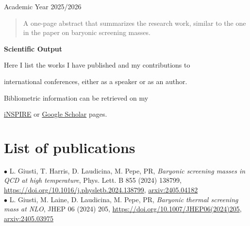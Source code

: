 \documentclass{report}
\begin{document}
\centerline{\LARGE{Academic Year 2025/2026}}
\begin{abstract}
   A one-page  abstract that summarizes
   the research work, similar to the one in the 
   paper on baryonic screening masses.	
\end{abstract}

{\centering
{\Large\textbf{Scientific Output}}\\[5mm]
\centerline{Here I list the works I have published and 
my contributions to}
\centerline{international conferences, either
as a speaker or as an author.}
\vspace{3mm}
\centerline{Bibliometric information can be retrieved on my}
\centerline{\href{https://inspirehep.net/authors/2727845?ui-citation-summary=true}{iNSPIRE} or \href{https://scholar.google.com/citations?user=3bmCuiAAAAAJ&hl=it}{Google Scholar} pages.}}



\section*{List of publications}
$\bullet$ L. Giusti, T. Harris, D. Laudicina, M. Pepe, PR, \textit{Baryonic screening masses in QCD at high temperature}, Phys. Lett. B 855 (2024) 138799,
\href{https://doi.org/10.1016/j.physletb.2024.138799}{https://doi.org/10.1016/j.physletb.2024.138799}, \href{https://arxiv.org/abs/2405.04182}{arxiv:2405.04182}\\[5mm]
$\bullet$ L. Giusti, M. Laine, D. Laudicina, M. Pepe, PR, \textit{Baryonic thermal screening mass at NLO}, JHEP 06 (2024) 205, \href{https://doi.org/10.1007/JHEP06(2024)205}{https://doi.org/10.1007/JHEP06(2024)205}, \href{https://arxiv.org/abs/2405.03975}{arxiv:2405.03975}
\end{document}
